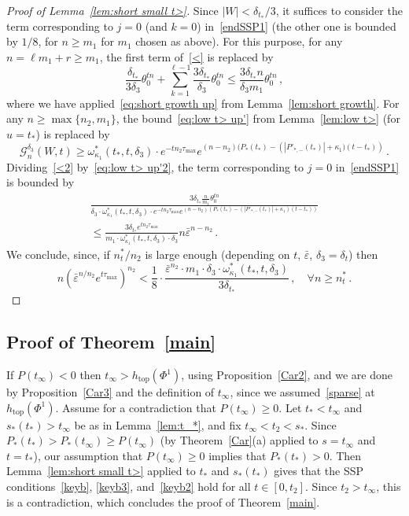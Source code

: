 \documentclass[10pt]{amsart}
\theoremstyle{definition}\newtheorem{defi}[theo]{Definition}\newtheorem{rema}[theo]{Remark}\newtheorem{exam}[theo]{Example}\newtheorem{exem}[theo]{Example}\newtheorem{nota}[theo]{Notation}
\newcommand{\cG}{\mathcal{G}}
\newcommand{\ve}{\varepsilon}
\newcommand{\htop}{h_{\scriptstyle{\text{top}}}}
\let\oldforall\forall
\renewcommand*{\forall}{\mathrel{\oldforall}}
\begin{document}
\begin{proof}[Proof of Lemma~\ref{lem:short small t>}]
Since $|W|<\delta_{t_*}/3$, it suffices to consider the term corresponding to $j=0$ (and $k=0$) in~\eqref{endSSP1} (the other one is bounded by $1/8$, for $n\ge m_1$ for $m_1$ chosen as above). For this purpose, for any $n=\ell m_1+r \ge m_1$, the first term of~\eqref{<} is replaced by
\begin{equation}\label{<2}
\frac{\delta_{t_*}}{3 \delta_3} \theta_0^{tn} + \sum_{k=1}^{\ell-1} \frac{3\delta_{t_*}}{\delta_3} \theta_0^{t n}
\le \frac{3 \delta_{t_*} n}{\delta_3 m_1} \theta_0^{t n } \,,
\end{equation}
where we have applied~\eqref{eq:short growth up} from Lemma~\ref{lem:short growth}. For any $n\ge \max\{n_2, m_1\}$, the bound~\eqref{eq:low t> up'} from Lemma~\ref{lem:low t>} (for $u=t_*$) is replaced by
\begin{equation}\label{eq:low t> up'2}
\cG_n^{\delta_3}(W,t)
\ge
\omega_{\kappa_1}^*(t_*,t, \delta_3) \cdot e^{-tn_2\tau_{\max}} e^{(n-n_2)(P_*(t_*)-\left(\left| P'_{*,-}(t_*)\right| + \kappa_1)(t-t_*)\right)} \,.
\end{equation}
Dividing~\eqref{<2} by~\eqref{eq:low t> up'2}, the term corresponding to $j=0$ in~\eqref{endSSP1} is bounded by
\begin{multline*}
\frac{3 { \delta_{t_*} } \frac{n}{m_1} \theta_0^{t n } } {\delta_3 \cdot \omega_{\kappa_1}^*(t_*,t, \delta_3) \cdot e^{-tn_2\tau_{\max}} e^{(n-n_2)\left(P_*(t_*)-\left(\left| P'_{*,-}(t_*)\right| + \kappa_1\right)(t-t_*)\right)}}\\
\le \frac{3 { \delta_{t_*} } e^{tn_2\tau_{\max}}} {m_1 \cdot \omega_{\kappa_1}^*(t_*,t, \delta_3)\cdot \delta_3 } n \bar \ve^{n-n_2}\,.
\end{multline*}
We conclude, since, if $n^*_t/n_2$ is large enough (depending on $t$, $\bar \ve$, $\delta_3=\delta_t$) then
\[
n\left(\bar \ve^{n/n_2} e^{t\tau_{\max}}\right)^{n_2}<
\frac 1 8 \cdot\frac{\bar \ve^{n_2} \cdot { m_1 \cdot } \delta_3\cdot \omega_{\kappa_1}^*(t_*,t, \delta_3) } {3 { \delta_{t_*} } }\,, \quad \forall n\ge n^*_t\,.
\]
\end{proof}

\subsection{Proof of Theorem~\ref{main}}\label{proofmain}


If $P(t_\infty)< 0$ then $t_\infty >\htop(\Phi^1)$, using Proposition~\ref{Car2}, and we are done by Proposition~\ref{Car3} and the definition of $t_\infty$, since we assumed~\eqref{sparse} at $\htop(\Phi^1)$. Assume for a contradiction that $P(t_\infty)\ge 0$. Let $t_*<t_\infty$ and $s_*(t_*)>t_\infty$ be as in Lemma~\ref{lem:t_*}, and fix $t_\infty<t_2<s_*$. Since $P_*(t_*)> P_*(t_\infty)\ge P(t_\infty)$ (by Theorem~\ref{Car}(a) applied to $s=t_\infty$ and $t=t_*$), our assumption that $P(t_\infty)\ge 0$ implies that $P_*(t_*)> 0$. Then Lemma~\ref{lem:short small t>} applied to $t_*$ and $s_*(t_*)$ gives that the SSP conditions~\eqref{keyb}, \eqref{keyb3}, and~\eqref{keyb2} hold for all $t \in [0, t_2]$. Since $t_2>t_\infty$, this is a contradiction, which concludes the proof of Theorem~\ref{main}.
\end{document}
